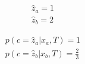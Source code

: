 \begin{align*}
\hat z_a = 1 \\
\hat z_b = 2
\end{align*}

\begin{align*}
p(c= \hat z_a|x_a,T) = 1 \\
p(c= \hat z_b|x_b,T) = \frac{2}{3}
\end{align*}

